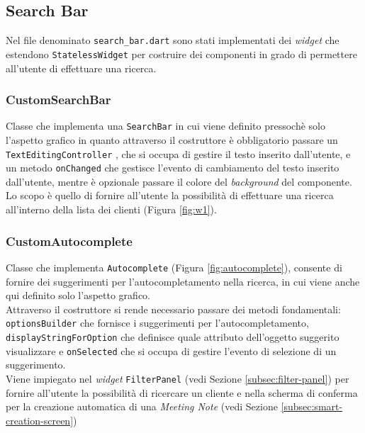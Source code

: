 \subsection{Search Bar}
\label{subsec:search-bar}

Nel file denominato \lstinline{search_bar.dart} sono stati implementati dei \emph{widget} che estendono \lstinline{StatelessWidget} per costruire dei componenti in grado di permettere all'utente di effettuare una ricerca.

\subsubsection*{CustomSearchBar}
\label{subsubsec:custom-search-bar}

Classe che implementa una \lstinline{SearchBar} \cite{site:search-bar} in cui viene definito pressochè solo l'aspetto grafico in quanto attraverso il costruttore è obbligatorio passare un \lstinline{TextEditingController} \cite{site:text-editing-controller}, che si occupa di gestire il testo inserito dall'utente, e un metodo \lstinline{onChanged} che gestisce l'evento di cambiamento del testo inserito dall'utente, mentre è opzionale passare il colore del \emph{background} del componente. \\
Lo scopo è quello di fornire all'utente la possibilità di effettuare una ricerca all'interno della lista dei clienti (Figura \ref{fig:w1}).

\subsubsection*{CustomAutocomplete}
\label{subsubsec:custom-autocomplete}

Classe che implementa \lstinline{Autocomplete} \cite{site:autocomplete} (Figura \ref{fig:autocomplete}), consente di fornire dei suggerimenti per l'autocompletamento nella ricerca, in cui viene anche qui definito solo l'aspetto grafico. \\
Attraverso il costruttore si rende necessario passare dei metodi fondamentali: \lstinline{optionsBuilder} che fornisce i suggerimenti per l'autocompletamento, \lstinline{displayStringForOption} che definisce quale attributo dell'oggetto suggerito visualizzare e \lstinline{onSelected} che si occupa di gestire l'evento di selezione di un suggerimento.\\
Viene impiegato nel \emph{widget} \lstinline{FilterPanel} (vedi Sezione \ref{subsec:filter-panel}) per fornire all'utente la possibilità di ricercare un cliente e nella scherma di conferma per la creazione automatica di una \emph{Meeting Note} (vedi Sezione \ref{subsec:smart-creation-screen})


